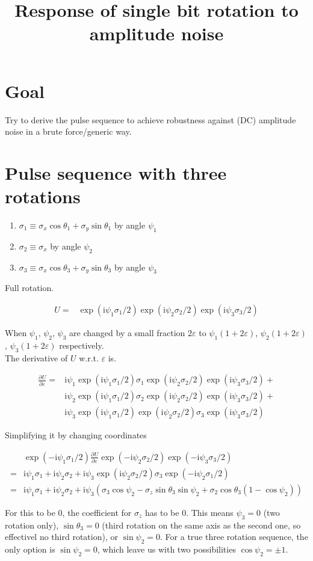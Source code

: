 \documentclass[10pt,fleqn]{article}
\title{Response of single bit rotation to amplitude noise}
\newcommand{\ui}{\mathrm{i}}
\newcommand{\eqar}[1]
{
  \begin{align*}
    #1
  \end{align*}
}
\newcommand{\paren}[1]{{\left({#1}\right)}}
\newcommand{\pdiff}[3][{}]{{\frac{\partial^{#1} {#2}}{\partial {#3}{}^{#1}}}}
\begin{document}
\maketitle

\section{Goal}
Try to derive the pulse sequence to achieve robustness against (DC) amplitude noise
in a brute force/generic way.

\section{Pulse sequence with three rotations}
\begin{enumerate}
\item $\sigma_1\equiv\sigma_x\cos\theta_1+\sigma_y\sin\theta_1$ by angle $\psi_1$
\item $\sigma_2\equiv\sigma_x$ by angle $\psi_2$
\item $\sigma_3\equiv\sigma_x\cos\theta_3+\sigma_y\sin\theta_3$ by angle $\psi_3$
\end{enumerate}

Full rotation.
\eqar{
  U=&\exp\paren{\ui\psi_1\sigma_1/2}\exp\paren{\ui\psi_2\sigma_2/2}\exp\paren{\ui\psi_3\sigma_3/2}
}

When $\psi_1$, $\psi_2$, $\psi_3$ are changed by a small fraction $2\varepsilon$ to
$\psi_1\paren{1+2\varepsilon}$, $\psi_2\paren{1+2\varepsilon}$,
$\psi_3\paren{1+2\varepsilon}$ respectively.\\

The derivative of $U$ w.r.t. $\varepsilon$ is.
\eqar{
  \pdiff{U}{\varepsilon}=&\ui\psi_1\exp\paren{\ui\psi_1\sigma_1/2}\sigma_1\exp\paren{\ui\psi_2\sigma_2/2}\exp\paren{\ui\psi_3\sigma_3/2}+\\
  &\ui\psi_2\exp\paren{\ui\psi_1\sigma_1/2}\sigma_2\exp\paren{\ui\psi_2\sigma_2/2}\exp\paren{\ui\psi_3\sigma_3/2}+\\
  &\ui\psi_3\exp\paren{\ui\psi_1\sigma_1/2}\exp\paren{\ui\psi_2\sigma_2/2}\sigma_3\exp\paren{\ui\psi_3\sigma_3/2}
}
Simplifying it by changing coordinates
\eqar{
  &\exp\paren{-\ui\psi_1\sigma_1/2}\pdiff{U}{\varepsilon}\exp\paren{-\ui\psi_2\sigma_2/2}\exp\paren{-\ui\psi_3\sigma_3/2}\\
  =&\ui\psi_1\sigma_1+\ui\psi_2\sigma_2+
  \ui\psi_3\exp\paren{\ui\psi_2\sigma_2/2}\sigma_3\exp\paren{-\ui\psi_2\sigma_1/2}\\
  =&\ui\psi_1\sigma_1+\ui\psi_2\sigma_2+
  \ui\psi_3\paren{\sigma_3\cos\psi_2-\sigma_z\sin\theta_3\sin\psi_2+\sigma_2\cos\theta_3(1-\cos\psi_2)}
}
For this to be $0$, the coefficient for $\sigma_z$ has to be $0$.
This means $\psi_3=0$ (two rotation only), $\sin\theta_3=0$
(third rotation on the same axis as the second one, so effectivel no third rotation),
or $\sin\psi_2=0$. For a true three rotation sequence,
the only option is $\sin\psi_2=0$,
which leave us with two possibilities $\cos\psi_2=\pm1$.\\
\end{document}
